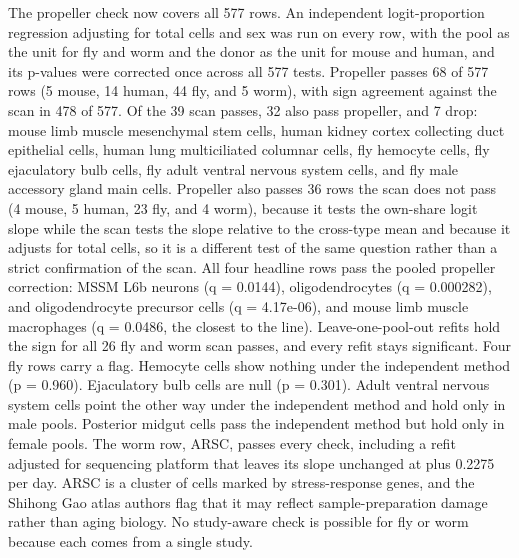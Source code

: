 \documentclass[11pt]{article}
\begin{document}
The propeller check now covers all 577 rows. An independent logit-proportion regression adjusting for total cells and sex was run on every row, with the pool as the unit for fly and worm and the donor as the unit for mouse and human, and its p-values were corrected once across all 577 tests. Propeller passes 68 of 577 rows (5 mouse, 14 human, 44 fly, and 5 worm), with sign agreement against the scan in 478 of 577. Of the 39 scan passes, 32 also pass propeller, and 7 drop: mouse limb muscle mesenchymal stem cells, human kidney cortex collecting duct epithelial cells, human lung multiciliated columnar cells, fly hemocyte cells, fly ejaculatory bulb cells, fly adult ventral nervous system cells, and fly male accessory gland main cells. Propeller also passes 36 rows the scan does not pass (4 mouse, 5 human, 23 fly, and 4 worm), because it tests the own-share logit slope while the scan tests the slope relative to the cross-type mean and because it adjusts for total cells, so it is a different test of the same question rather than a strict confirmation of the scan. All four headline rows pass the pooled propeller correction: MSSM L6b neurons (q = 0.0144), oligodendrocytes (q = 0.000282), and oligodendrocyte precursor cells (q = 4.17e-06), and mouse limb muscle macrophages (q = 0.0486, the closest to the line). Leave-one-pool-out refits hold the sign for all 26 fly and worm scan passes, and every refit stays significant. Four fly rows carry a flag. Hemocyte cells show nothing under the independent method (p = 0.960). Ejaculatory bulb cells are null (p = 0.301). Adult ventral nervous system cells point the other way under the independent method and hold only in male pools. Posterior midgut cells pass the independent method but hold only in female pools. The worm row, ARSC, passes every check, including a refit adjusted for sequencing platform that leaves its slope unchanged at plus 0.2275 per day. ARSC is a cluster of cells marked by stress-response genes, and the Shihong Gao atlas authors flag that it may reflect sample-preparation damage rather than aging biology. No study-aware check is possible for fly or worm because each comes from a single study.
\end{document}

